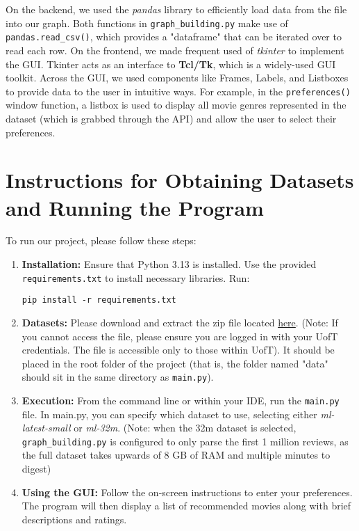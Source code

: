 \documentclass[12pt]{article}
\begin{document}
On the backend, we used the \textit{pandas} library to efficiently load data from the file into our graph. Both functions in \texttt{graph\_building.py} make use of \texttt{pandas.read\_csv()}, which provides a "dataframe" that can be iterated over to read each row.
On the frontend, we made frequent used of \textit{tkinter} to implement the GUI. Tkinter acts as an interface to \textbf{Tcl/Tk}, which is a widely-used GUI toolkit. Across the GUI, we used components like Frames, Labels, and Listboxes to provide data to the user in intuitive ways. For example, in the \texttt{preferences()} window function, a listbox is used to display all movie genres represented in the dataset (which is grabbed through the API) and allow the user to select their preferences.

\section{Instructions for Obtaining Datasets and Running the Program}
To run our project, please follow these steps:
\begin{enumerate}
    \item \textbf{Installation:} Ensure that Python 3.13 is installed. Use the provided \texttt{requirements.txt} to install necessary libraries. Run:
    \begin{verbatim}
pip install -r requirements.txt
    \end{verbatim}
    \item \textbf{Datasets:} Please download and extract the zip file located \href{https://utoronto-my.sharepoint.com/:u:/g/personal/aiden_chettleburgh_mail_utoronto_ca/EWullXGtCOpBlOvOkgNzJrgBNfUv2LnhMl_ELSGbOVA1Lw?e=gBJdVQ}{here}. 
    (Note: If you cannot access the file, please ensure you are logged in with your UofT credentials. The file is accessible only to those within UofT).
    It should be placed in the root folder of the project (that is, the folder named "data" should sit in the same directory as \texttt{main.py}).
    \item \textbf{Execution:} From the command line or within your IDE, run the \texttt{main.py} file. In main.py, you can specify which dataset to use, selecting either \textit{ml-latest-small} or \textit{ml-32m}. (Note: when the 32m dataset is selected, \texttt{graph\_building.py} is configured to only parse the first 1 million reviews, as the full dataset takes upwards of 8 GB of RAM and multiple minutes to digest)
    \item \textbf{Using the GUI:} Follow the on-screen instructions to enter your preferences. The program will then display a list of recommended movies along with brief descriptions and ratings.
\end{enumerate}
\end{document}
